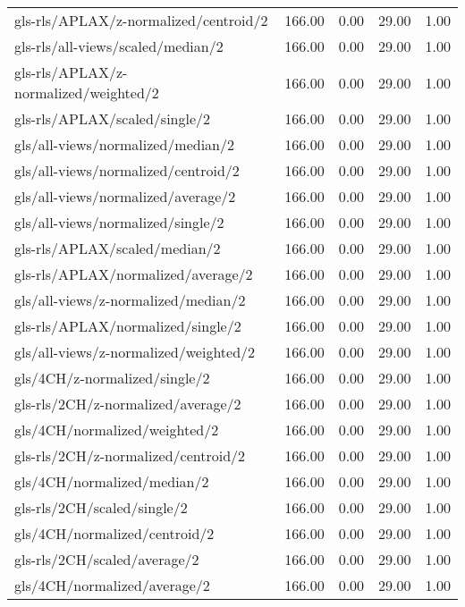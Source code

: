\begin{longtable}{lrrrr}
    gls-rls/APLAX/z-normalized/centroid/2     & 166.00 &  0.00 & 29.00 &  1.00 \\
    gls-rls/all-views/scaled/median/2         & 166.00 &  0.00 & 29.00 &  1.00 \\
    gls-rls/APLAX/z-normalized/weighted/2     & 166.00 &  0.00 & 29.00 &  1.00 \\
    gls-rls/APLAX/scaled/single/2             & 166.00 &  0.00 & 29.00 &  1.00 \\
    gls/all-views/normalized/median/2         & 166.00 &  0.00 & 29.00 &  1.00 \\
    gls/all-views/normalized/centroid/2       & 166.00 &  0.00 & 29.00 &  1.00 \\
    gls/all-views/normalized/average/2        & 166.00 &  0.00 & 29.00 &  1.00 \\
    gls/all-views/normalized/single/2         & 166.00 &  0.00 & 29.00 &  1.00 \\
    gls-rls/APLAX/scaled/median/2             & 166.00 &  0.00 & 29.00 &  1.00 \\
    gls-rls/APLAX/normalized/average/2        & 166.00 &  0.00 & 29.00 &  1.00 \\
    gls/all-views/z-normalized/median/2       & 166.00 &  0.00 & 29.00 &  1.00 \\
    gls-rls/APLAX/normalized/single/2         & 166.00 &  0.00 & 29.00 &  1.00 \\
    gls/all-views/z-normalized/weighted/2     & 166.00 &  0.00 & 29.00 &  1.00 \\
    gls/4CH/z-normalized/single/2             & 166.00 &  0.00 & 29.00 &  1.00 \\
    gls-rls/2CH/z-normalized/average/2        & 166.00 &  0.00 & 29.00 &  1.00 \\
    gls/4CH/normalized/weighted/2             & 166.00 &  0.00 & 29.00 &  1.00 \\
    gls-rls/2CH/z-normalized/centroid/2       & 166.00 &  0.00 & 29.00 &  1.00 \\
    gls/4CH/normalized/median/2               & 166.00 &  0.00 & 29.00 &  1.00 \\
    gls-rls/2CH/scaled/single/2               & 166.00 &  0.00 & 29.00 &  1.00 \\
    gls/4CH/normalized/centroid/2             & 166.00 &  0.00 & 29.00 &  1.00 \\
    gls-rls/2CH/scaled/average/2              & 166.00 &  0.00 & 29.00 &  1.00 \\
    gls/4CH/normalized/average/2              & 166.00 &  0.00 & 29.00 &  1.00 \\

\end{longtable}
